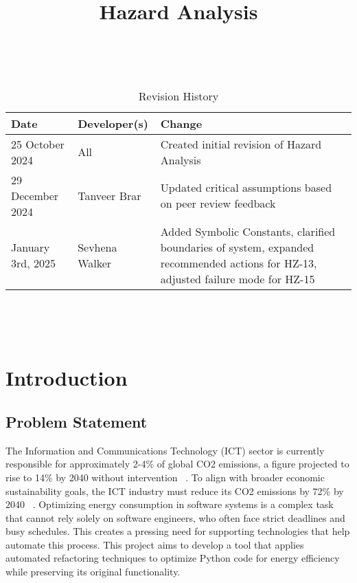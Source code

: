 \documentclass{article}
\title{Hazard Analysis\\\progname}
\author{\authname}
\date{}
\begin{document}
\maketitle
\thispagestyle{empty}

~\newpage


\begin{table}[hp]
\caption{Revision History} \label{TblRevisionHistory}
\begin{tabularx}{\textwidth}{ll>{\raggedright\arraybackslash}X}
\toprule
\textbf{Date} & \textbf{Developer(s)} & \textbf{Change}\\
\midrule
25 October 2024 & All & Created initial revision of Hazard Analysis\\
29 December 2024 & Tanveer Brar & Updated critical assumptions based on peer review feedback\\
January 3rd, 2025 & Sevhena Walker & Added Symbolic Constants, clarified boundaries of system, expanded recommended actions for HZ-13, adjusted failure mode for HZ-15 \\
\bottomrule
\end{tabularx}
\end{table}

~\newpage

\tableofcontents

~\newpage




\section{Introduction}

\subsection{Problem Statement}
The Information and Communications Technology (ICT) sector is currently responsible
for approximately 2-4\% of global CO2 emissions, a figure projected to rise to 14\% 
by 2040 without intervention ~\citep{BelkhirAndElmeligi2018}. To align with broader 
economic sustainability goals, the ICT industry must reduce its CO2 emissions by 72\% 
by 2040 ~\citep{FreitagAndBernersLee2021}. Optimizing energy consumption in software 
systems is a complex task that cannot rely solely on software engineers, who often 
face strict deadlines and busy schedules. This creates a pressing need for supporting 
technologies that help automate this process. This project aims to develop a tool that 
applies automated refactoring techniques to optimize Python code for energy efficiency 
while preserving its original functionality. 
\end{document}
